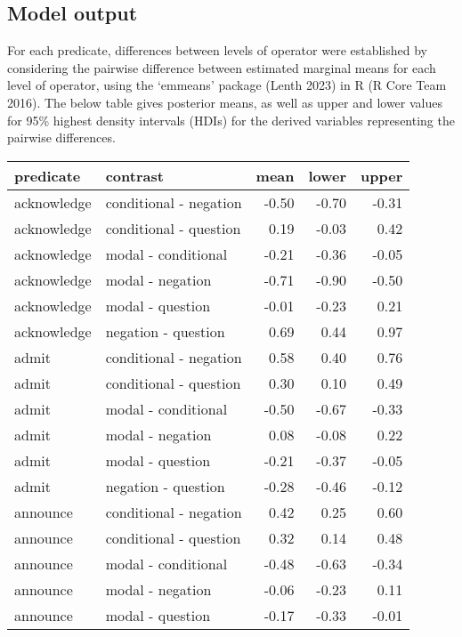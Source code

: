 \documentclass[11pt,fleqn]{article}
\newcommand{\6}{\mbox{$[\hspace*{-.6mm}[$}}
\newcommand{\9}{\mbox{$]\hspace*{-.6mm}]$}}
\begin{document}
    \subsection{Model output}
        
    For each predicate, differences between levels of operator were established by considering the pairwise difference between estimated marginal means for each level of operator, using the ‘emmeans’ package (Lenth 2023) in R (R Core Team 2016). The below table gives posterior means, as well as upper and lower values for 95\% highest density intervals (HDIs) for the derived variables representing the pairwise differences.

    \begin{longtable}{llrrr}\toprule
     predicate & contrast & mean & lower & upper \\ \midrule
     acknowledge & conditional - negation & -0.50 & -0.70 & -0.31 \\ 
      acknowledge & conditional - question & 0.19 & -0.03 & 0.42 \\ 
      acknowledge & modal - conditional & -0.21 & -0.36 & -0.05 \\ 
      acknowledge & modal - negation & -0.71 & -0.90 & -0.50 \\ 
      acknowledge & modal - question & -0.01 & -0.23 & 0.21 \\ 
      acknowledge & negation - question & 0.69 & 0.44 & 0.97 \\ \midrule
      admit & conditional - negation & 0.58 & 0.40 & 0.76 \\ 
      admit & conditional - question & 0.30 & 0.10 & 0.49 \\ 
      admit & modal - conditional & -0.50 & -0.67 & -0.33 \\ 
      admit & modal - negation & 0.08 & -0.08 & 0.22 \\ 
      admit & modal - question & -0.21 & -0.37 & -0.05 \\ 
      admit & negation - question & -0.28 & -0.46 & -0.12 \\ \midrule
      announce & conditional - negation & 0.42 & 0.25 & 0.60 \\ 
      announce & conditional - question & 0.32 & 0.14 & 0.48 \\ 
      announce & modal - conditional & -0.48 & -0.63 & -0.34 \\ 
      announce & modal - negation & -0.06 & -0.23 & 0.11 \\ 
      announce & modal - question & -0.17 & -0.33 & -0.01 \\ 

\end{longtable}
\end{document}
